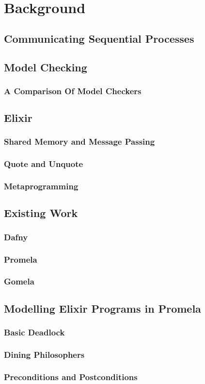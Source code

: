 \chapter{Background}
\section[]{Communicating Sequential Processes}
\section[]{Model Checking}
\subsection[]{A Comparison Of Model Checkers}
\section[]{Elixir}
\subsection[]{Shared Memory and Message Passing}
\subsection[]{Quote and Unquote}
\subsection[]{Metaprogramming}
\section[]{Existing Work}
\subsection[]{Dafny}
\subsection[]{Promela}
\subsection[]{Gomela}
\section[]{Modelling Elixir Programs in Promela}
\subsection[]{Basic Deadlock}
\subsection[]{Dining Philosophers}
\subsection[]{Preconditions and Postconditions}

